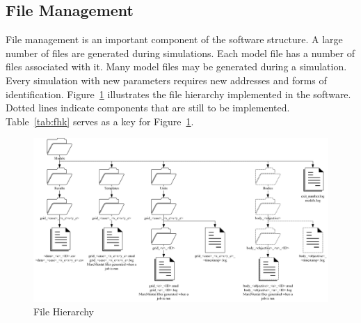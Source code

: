 \subsection{File Management}

File management is an important component of the software structure. A large number of files are generated during simulations. Each model file has a number of files associated with it. Many model files may be generated during a simulation. Every simulation with new parameters requires new addresses and forms of identification. Figure~\ref{fig:fh} illustrates the file hierarchy implemented in the software. Dotted lines indicate components that are still to be implemented. Table~\ref{tab:fhk} serves as a key for Figure~\ref{fig:fh}.

\begin{landscape}
	\begin{figure}
  		\centering
  		\includegraphics[width=1.6\textwidth]{file.png}
  		\caption{File Hierarchy}
  		\label{fig:fh}
	\end{figure}
\end{landscape}

